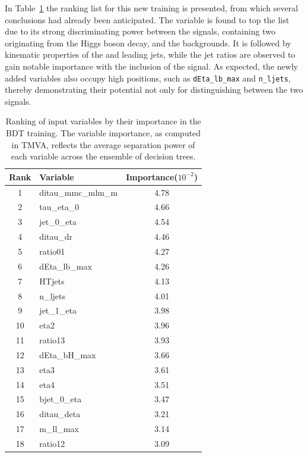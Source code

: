 In Table~\ref{ranking_tH_ttH} the ranking list for this new training is presented, from which several conclusions had already been anticipated. The \mmc variable is found to top the list due to its strong discriminating power between the signals, containing two \tauhad originating from the Higgs boson decay, and the backgrounds. 
It is followed by kinematic properties of the \tauhad and leading jets, while the jet \pt ratios are observed to gain notable importance with the inclusion of the \thtt signal. As expected, the newly added variables also occupy high positions, such as \texttt{dEta\_lb\_max} and \texttt{n\_ljets}, thereby demonstrating their potential not only for distinguishing between the two signals.

\begin{table}[h]
  \centering
  \scriptsize
  \caption{Ranking of input variables by their importance in the BDT training. The variable importance, as computed in TMVA, reflects the average separation power of each variable across the ensemble of decision trees.}
  \label{ranking_tH_ttH}
  \renewcommand{\arraystretch}{1.05}
  \setlength{\tabcolsep}{10pt}
  \begin{tabular}{c l c}
    \toprule
    \textbf{Rank} & \textbf{Variable} & \textbf{Importance}\tiny{($10^{-2}$)} \\
    \midrule
     1 & ditau\_mmc\_mlm\_m & 4.78 \\
     2 & tau\_eta\_0 & 4.66 \\
     3 & jet\_0\_eta & 4.54 \\
     4 & ditau\_dr & 4.46 \\
     5 & ratio01 & 4.27 \\
     6 & dEta\_lb\_max & 4.26 \\
     7 & HTjets & 4.13 \\
     8 & n\_ljets & 4.01 \\
     9 & jet\_1\_eta & 3.98 \\
    10 & eta2 & 3.96 \\
    11 & ratio13 & 3.93 \\
    12 & dEta\_bH\_max & 3.66 \\
    13 & eta3 & 3.61 \\
    14 & eta4 & 3.51 \\
    15 & bjet\_0\_eta & 3.47 \\
    16 & ditau\_deta & 3.21 \\
    17 & m\_ll\_max & 3.14 \\
    18 & ratio12 & 3.09 \\

\end{tabular}
\end{table}

